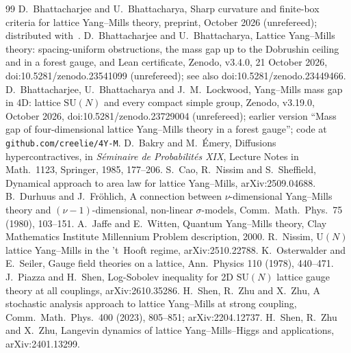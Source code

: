 \documentclass[11pt]{amsart}
\theoremstyle{definition}
\theoremstyle{remark}
\newcommand{\SU}{\mathrm{SU}}
\begin{document}
\begin{thebibliography}{99}
 D.~Bhattacharjee and U.~Bhattacharya, Sharp curvature and finite-box criteria for lattice
Yang--Mills theory, preprint, October 2026 (unrefereed); distributed with~\cite{BBL}.
 D.~Bhattacharjee and U.~Bhattacharya, Lattice Yang--Mills theory: spacing-uniform obstructions, the
mass gap up to the Dobrushin ceiling and in a forest gauge, and Lean certificate, Zenodo, v3.4.0, 21 October 2026,
doi:10.5281/zenodo.23541099 (unrefereed); see also doi:10.5281/zenodo.23449466.
 D.~Bhattacharjee, U.~Bhattacharya and J.~M.~Lockwood, Yang--Mills mass gap in 4D: lattice $\SU(N)$ and every
compact simple group, Zenodo, v3.19.0, October 2026, doi:10.5281/zenodo.23729004 (unrefereed); earlier version
``Mass gap of four-dimensional lattice Yang--Mills theory in a forest gauge''; code at
\texttt{github.com/creelie/4Y-M}.
 D.~Bakry and M.~\'Emery, Diffusions hypercontractives, in \emph{S\'eminaire de Probabilit\'es XIX},
Lecture Notes in Math.\ 1123, Springer, 1985, 177--206.
 S.~Cao, R.~Nissim and S.~Sheffield, Dynamical approach to area law for lattice Yang--Mills,
arXiv:2509.04688.
 B.~Durhuus and J.~Fr\"ohlich, A connection between $\nu$-dimensional Yang--Mills theory and
$(\nu-1)$-dimensional, non-linear $\sigma$-models, Comm.\ Math.\ Phys.\ 75 (1980), 103--151.
 A.~Jaffe and E.~Witten, Quantum Yang--Mills theory, Clay Mathematics Institute Millennium Problem
description, 2000.
 R.~Nissim, $\mathrm{U}(N)$ lattice Yang--Mills in the 't~Hooft regime, arXiv:2510.22788.
 K.~Osterwalder and E.~Seiler, Gauge field theories on a lattice, Ann.\ Physics 110 (1978), 440--471.
 J.~Piazza and H.~Shen, Log-Sobolev inequality for 2D $\SU(N)$ lattice gauge theory at all couplings,
arXiv:2610.35286.
 H.~Shen, R.~Zhu and X.~Zhu, A stochastic analysis approach to lattice Yang--Mills at strong coupling,
Comm.\ Math.\ Phys.\ 400 (2023), 805--851; arXiv:2204.12737.
 H.~Shen, R.~Zhu and X.~Zhu, Langevin dynamics of lattice Yang--Mills--Higgs and applications,
arXiv:2401.13299.
\end{thebibliography}
\end{document}
